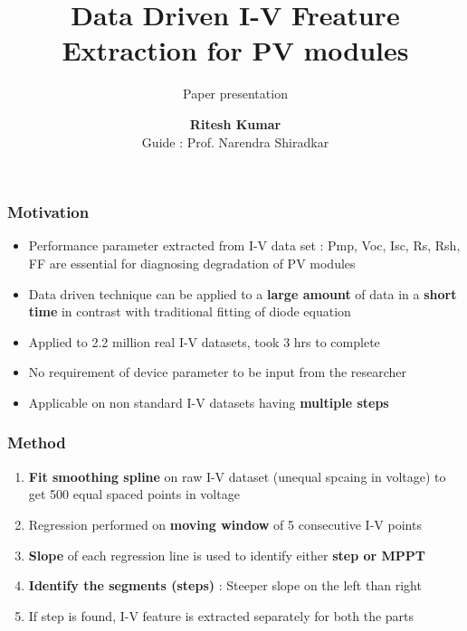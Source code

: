 \documentclass{beamer}
\title[DDP Phase 1]{\textbf{\large Data Driven I-V Freature Extraction for PV modules}}
\subtitle{Paper presentation}
\author [Ritesh Kumar]{\textbf{Ritesh Kumar} \\ Guide : Prof. Narendra Shiradkar}
\institute[IITB]{Electrical Engineering \\ IIT Bombay}
\newcommand\Fontvi{\fontsize{7.3}{7}\selectfont}
\begin{document}
	\begin{frame}[t]
		\titlepage
	\end{frame}

	\begin{frame}
	\frametitle{Motivation}
		\begin{itemize}
			\item Performance parameter extracted from I-V data set : Pmp, Voc, Isc, Rs, Rsh, FF are essential for diagnosing degradation of PV modules
			\item Data driven technique can be applied to a \textbf{large amount} of data in a \textbf{short time} in contrast with traditional fitting of diode equation
			\item Applied to 2.2 million real I-V datasets, took 3 hrs to complete
			\item No requirement of device parameter to be input from the researcher
			\item Applicable on non standard I-V datasets having \textbf{multiple steps}
		\end{itemize}
	\end{frame}

	\begin{frame}[t]
		\frametitle{Method}
		\begin{enumerate}
			\item \textbf{Fit smoothing spline} on raw I-V dataset (unequal spcaing in voltage) to get 500 equal spaced points in voltage
			\item Regression performed on \textbf{moving window} of 5 consecutive I-V points
			\item \textbf{Slope} of each regression line is used to identify either \textbf{step or MPPT}
			\item \textbf{Identify the segments (steps)} : Steeper slope on the left than right
			\item If step is found, I-V feature is extracted separately for both the parts
		\end{enumerate}
	\end{frame}
\end{document}
